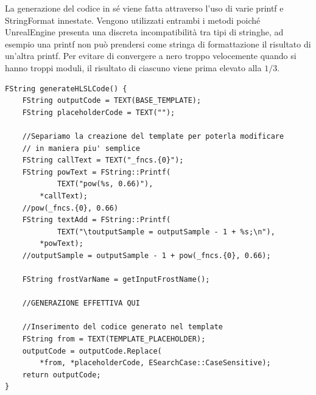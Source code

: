\documentclass[main.tex]{subfiles}
\begin{document}
La generazione del codice in sé viene fatta attraverso l'uso di varie printf e StringFormat innestate. Vengono utilizzati entrambi i metodi poiché UnrealEngine presenta una discreta incompatibilità tra tipi di stringhe, ad esempio una printf non può prendersi come stringa di formattazione il risultato di un'altra printf. \newline 
Per evitare di convergere a nero troppo velocemente quando si hanno troppi moduli, il risultato di ciascuno viene prima elevato alla $1/3$.
\lstset{language=UEcpp}
\begin{lstlisting}
FString generateHLSLCode() {
    FString outputCode = TEXT(BASE_TEMPLATE);
    FString placeholderCode = TEXT("");

    //Separiamo la creazione del template per poterla modificare
    // in maniera piu' semplice
    FString callText = TEXT("_fncs.{0}");
    FString powText = FString::Printf(
            TEXT("pow(%s, 0.66)"),
        *callText);
    //pow(_fncs.{0}, 0.66)
    FString textAdd = FString::Printf(
            TEXT("\toutputSample = outputSample - 1 + %s;\n"),
        *powText);
    //outputSample = outputSample - 1 + pow(_fncs.{0}, 0.66);
    
    FString frostVarName = getInputFrostName();

    //GENERAZIONE EFFETTIVA QUI

    //Inserimento del codice generato nel template
    FString from = TEXT(TEMPLATE_PLACEHOLDER);
	outputCode = outputCode.Replace(
        *from, *placeholderCode, ESearchCase::CaseSensitive);
	return outputCode;
}
\end{lstlisting}
\end{document}
